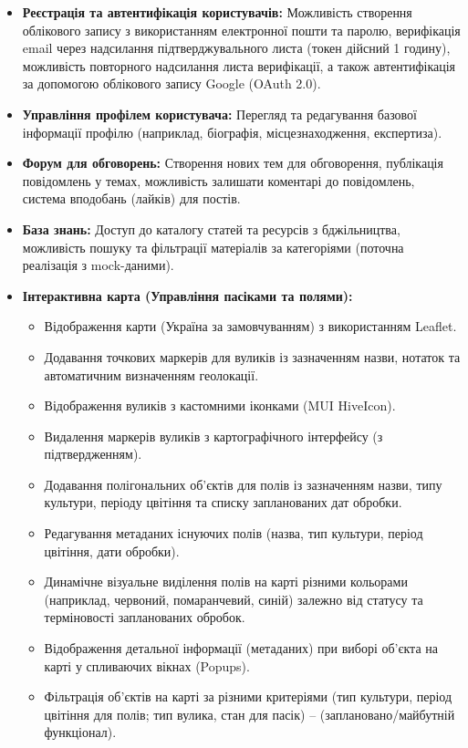 \begin{itemize}
    \item \textbf{Реєстрація та автентифікація користувачів:} Можливість створення облікового запису з використанням електронної пошти та паролю, верифікація email через надсилання підтверджувального листа (токен дійсний 1 годину), можливість повторного надсилання листа верифікації, а також автентифікація за допомогою облікового запису Google (OAuth 2.0).
    \item \textbf{Управління профілем користувача:} Перегляд та редагування базової інформації профілю (наприклад, біографія, місцезнаходження, експертиза).
    \item \textbf{Форум для обговорень:} Створення нових тем для обговорення, публікація повідомлень у темах, можливість залишати коментарі до повідомлень, система вподобань (лайків) для постів.
    \item \textbf{База знань:} Доступ до каталогу статей та ресурсів з бджільництва, можливість пошуку та фільтрації матеріалів за категоріями (поточна реалізація з mock-даними).
    \item \textbf{Інтерактивна карта (Управління пасіками та полями):} 
        \begin{itemize}
            \item Відображення карти (Україна за замовчуванням) з використанням Leaflet.
            \item Додавання точкових маркерів для вуликів із зазначенням назви, нотаток та автоматичним визначенням геолокації.
            \item Відображення вуликів з кастомними іконками (MUI HiveIcon).
            \item Видалення маркерів вуликів з картографічного інтерфейсу (з підтвердженням).
            \item Додавання полігональних об'єктів для полів із зазначенням назви, типу культури, періоду цвітіння та списку запланованих дат обробки.
            \item Редагування метаданих існуючих полів (назва, тип культури, період цвітіння, дати обробки).
            \item Динамічне візуальне виділення полів на карті різними кольорами (наприклад, червоний, помаранчевий, синій) залежно від статусу та терміновості запланованих обробок.
            \item Відображення детальної інформації (метаданих) при виборі об'єкта на карті у спливаючих вікнах (Popups).
            \item Фільтрація об'єктів на карті за різними критеріями (тип культури, період цвітіння для полів; тип вулика, стан для пасік) -- (заплановано/майбутній функціонал).

\end{itemize}
\end{itemize}
